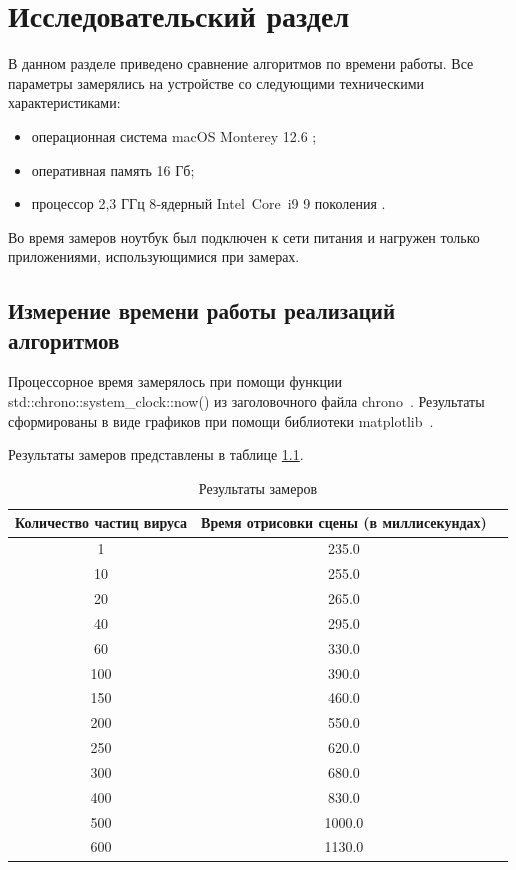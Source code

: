 \chapter{Исследовательский раздел}
\label{cha:research}

В данном разделе приведено сравнение алгоритмов по времени работы.
Все параметры замерялись на устройстве со следующими техническими характеристиками:
\begin{itemize}
	\item операционная система macOS Monterey 12.6 \cite{monterey};
	\item оперативная память 16 Гб;
	\item процессор 2,3 ГГц 8‑ядерный Intel Core i9 9 поколения \cite{intel}.
\end{itemize}

Во время замеров ноутбук был подключен к сети питания и нагружен только приложениями, использующимися при замерах.

\section{Измерение времени работы реализаций алгоритмов}

Процессорное время замерялось при помощи функции std::chrono::system\_clock::now() из заголовочного файла chrono~\cite{cplusplus}. Результаты сформированы в виде графиков при помощи библиотеки matplotlib~\cite{matplotlib}. 

Результаты замеров представлены в таблице \ref{tbl:timings}.

\begin{table}[h]
	\begin{center}
		\begin{threeparttable}
			\captionsetup{justification=raggedright,singlelinecheck=off}
			\caption{\label{tbl:timings} Результаты замеров}
			\begin{tabular}{|c|c|c|}
				\hline
				Количество частиц вируса& Время отрисовки сцены (в миллисекундах) \\  \hline
				1 & 235.0 \\ \hline 
				10 & 255.0 \\ \hline 
				20 & 265.0 \\ \hline 
				40 & 295.0 \\ \hline 
				60 & 330.0 \\ \hline 
				100 & 390.0 \\ \hline 
				150 & 460.0 \\ \hline 
				200 & 550.0 \\ \hline 
				250 & 620.0 \\ \hline 
				300 & 680.0 \\ \hline 
				400 & 830.0 \\ \hline 
				500 & 1000.0 \\ \hline 
				600 & 1130.0 \\ \hline 
			\end{tabular}
		\end{threeparttable}
	\end{center}
	
\end{table}

